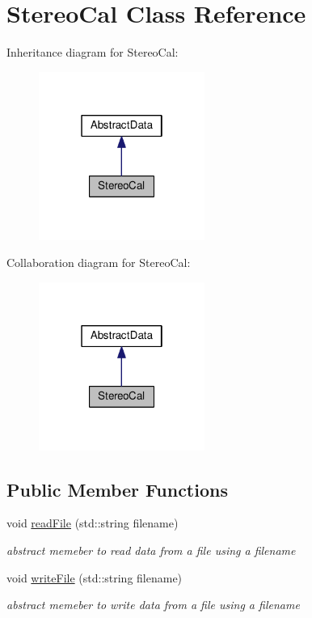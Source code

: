 \hypertarget{classStereoCal}{}\section{Stereo\+Cal Class Reference}
\label{classStereoCal}


Inheritance diagram for Stereo\+Cal\+:\nopagebreak
\begin{figure}[H]
\begin{center}
\leavevmode
\includegraphics[width=154pt]{classStereoCal__inherit__graph}
\end{center}
\end{figure}


Collaboration diagram for Stereo\+Cal\+:\nopagebreak
\begin{figure}[H]
\begin{center}
\leavevmode
\includegraphics[width=154pt]{classStereoCal__coll__graph}
\end{center}
\end{figure}
\subsection*{Public Member Functions}
\begin{DoxyCompactItemize}
\item 
void \hyperlink{classStereoCal_a88808ab1dcc56daa4838bee7b4d1eadb}{read\+File} (std\+::string filename)
\begin{DoxyCompactList}\small\item\em abstract memeber to read data from a file using a filename \end{DoxyCompactList}\item 
void \hyperlink{classStereoCal_ac31d3a00ccfb336f0755a12053609710}{write\+File} (std\+::string filename)
\begin{DoxyCompactList}\small\item\em abstract memeber to write data from a file using a filename \end{DoxyCompactList}\end{DoxyCompactItemize}
